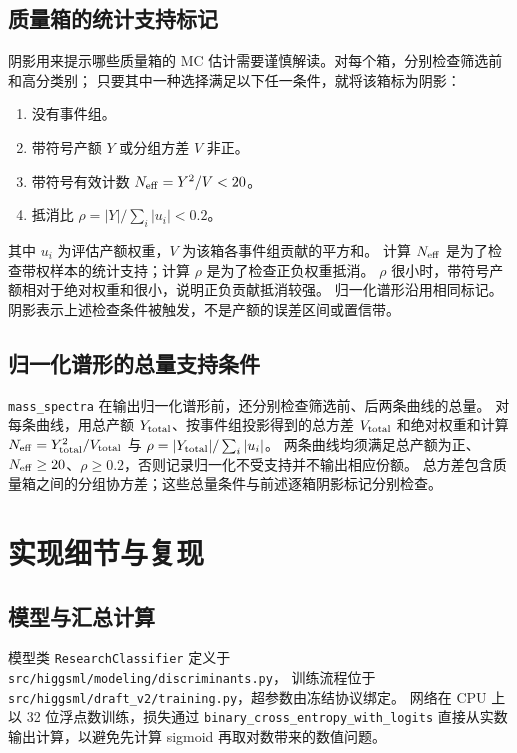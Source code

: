 \documentclass[11pt,a4paper,fontset=fandol,scheme=plain]{ctexart}
\begin{document}
\subsection{质量箱的统计支持标记}
阴影用来提示哪些质量箱的 MC 估计需要谨慎解读。对每个箱，分别检查筛选前和高分类别；
只要其中一种选择满足以下任一条件，就将该箱标为阴影：
\begin{enumerate}[leftmargin=1.7em,itemsep=2pt]
\item 没有事件组。
\item 带符号产额 $Y$ 或分组方差 $V$ 非正。
\item 带符号有效计数 $N_{\rm eff}=Y^2/V<20$。
\item 抵消比 $\rho=|Y|/\sum_i|u_i|<0.2$。
\end{enumerate}
其中 $u_i$ 为评估产额权重，$V$ 为该箱各事件组贡献的平方和。
计算 $N_{\rm eff}$ 是为了检查带权样本的统计支持；计算 $\rho$ 是为了检查正负权重抵消。
$\rho$ 很小时，带符号产额相对于绝对权重和很小，说明正负贡献抵消较强。
归一化谱形沿用相同标记。阴影表示上述检查条件被触发，不是产额的误差区间或置信带。

\subsection{归一化谱形的总量支持条件}\label{app:shape-support}
\texttt{mass\_spectra} 在输出归一化谱形前，还分别检查筛选前、后两条曲线的总量。
对每条曲线，用总产额 $Y_{\rm total}$、按事件组投影得到的总方差 $V_{\rm total}$ 和绝对权重和计算
$N_{\rm eff}=Y_{\rm total}^2/V_{\rm total}$ 与 $\rho=|Y_{\rm total}|/\sum_i|u_i|$。
两条曲线均须满足总产额为正、$N_{\rm eff}\geq20$、$\rho\geq0.2$，否则记录归一化不受支持并不输出相应份额。
总方差包含质量箱之间的分组协方差；这些总量条件与前述逐箱阴影标记分别检查。

\section{实现细节与复现}\label{app:network}


\subsection{模型与汇总计算}
模型类 \texttt{ResearchClassifier} 定义于 \nolinkurl{src/higgsml/modeling/discriminants.py}，
训练流程位于 \nolinkurl{src/higgsml/draft_v2/training.py}，超参数由冻结协议绑定。
网络在 CPU 上以 32 位浮点数训练，损失通过 \texttt{binary\_cross\_entropy\_with\_logits}
直接从实数输出计算，以避免先计算 sigmoid 再取对数带来的数值问题。
\end{document}
